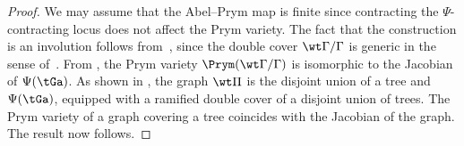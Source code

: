 \begin{proof}
    We may assume that the Abel--Prym map is finite since contracting the $\Psi$-contracting locus does not affect the Prym variety. 
    The fact that the construction is an involution follows from~\cite[Proposition 2.4]{RZ_ngonal}, since the double cover $\wt\Gamma/\Gamma$ is generic in the sense of~\cite[Definition 2.3]{RZ_ngonal}. 
From , the Prym variety $\Prym(\wt\Gamma/\Gamma)$ is isomorphic to the Jacobian of $\Psi(\tGa)$.  As shown in , the graph $\wt \Pi$ is the disjoint union of a tree and $\Psi(\tGa)$, equipped with a ramified double cover of a disjoint union of trees.  The Prym variety of a graph covering a tree coincides with the Jacobian of the graph. The result now follows.
\end{proof}
